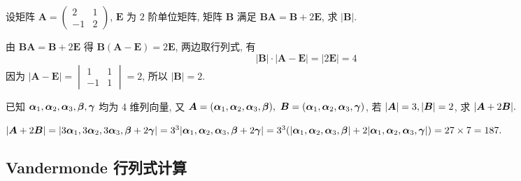 \begin{example}[2006 数一]
    设矩阵 $\boldsymbol{A}=\begin{pmatrix}
            2  & 1 \\
            -1 & 2
        \end{pmatrix}$, $\boldsymbol{E}$ 为 $2$ 阶单位矩阵, 矩阵 $\boldsymbol{B}$ 满足 $\boldsymbol{BA}=\boldsymbol{B}+2\boldsymbol{E}$, 求 $|\boldsymbol{B}|$.
\end{example}
\begin{solution}
    由 $\boldsymbol{BA}=\boldsymbol{B}+2\boldsymbol{E}$ 得 $\boldsymbol{B}(\boldsymbol{A}-\boldsymbol{E})=2\boldsymbol{E}$, 两边取行列式, 有
    $$|\boldsymbol{B}|\cdot|\boldsymbol{A}-\boldsymbol{E}|=|2\boldsymbol{E}|=4$$
    因为 $|\boldsymbol{A}-\boldsymbol{E}|=\begin{vmatrix}
            1  & 1 \\
            -1 & 1
        \end{vmatrix}=2$, 所以 $|\boldsymbol{B}|=2.$
\end{solution}

\begin{example}
    已知 $\vb*{\alpha}_1,\vb*{\alpha}_2,\vb*{\alpha}_3,\vb*{\beta},\vb*{\gamma}$ 均为 4 维列向量, 又 $\vb*{A}=(\vb*{\alpha}_1,\vb*{\alpha}_2,\vb*{\alpha}_3,\vb*{\beta}),~\vb*{B}=(\vb*{\alpha}_1,\vb*{\alpha}_2,\vb*{\alpha}_3,\vb*{\gamma})$, 
    若 $|\vb*{A}|=3,|\vb*{B}|=2$, 求 $|\vb*{A}+2\vb*{B}|.$
\end{example}
\begin{solution}
    $|\vb*{A}+2\vb*{B}|=|3\vb*{\alpha}_1,3\vb*{\alpha}_2,3\vb*{\alpha}_3,\vb*{\beta}+2\vb*{\gamma}|=3^3|\vb*{\alpha}_1,\vb*{\alpha}_2,\vb*{\alpha}_3,\vb*{\beta}+2\vb*{\gamma}|=3^3\qty(|\vb*{\alpha}_1,\vb*{\alpha}_2,\vb*{\alpha}_3,\vb*{\beta}|+2|\vb*{\alpha}_1,\vb*{\alpha}_2,\vb*{\alpha}_3,\vb*{\gamma}|)=27\times 7=187.$
\end{solution}

\subsection{Vandermonde 行列式计算}

